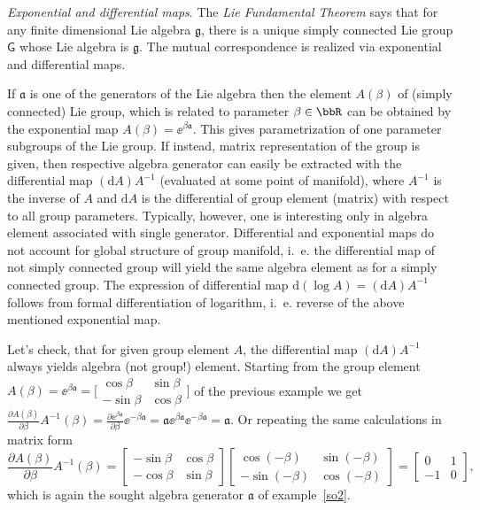 \begin{unit}\textit{Exponential and differential maps}.\label{expdiffmap}
The \textit{Lie Fundamental Theorem} says that for any finite
dimensional Lie algebra $\mathfrak{g}$, there is a unique simply
connected Lie group $\mathsf{G}$ whose Lie algebra is
$\mathfrak{g}$. The mutual correspondence is realized via
exponential and differential maps.

If $\mathfrak{a}$ is one of the generators of the Lie algebra then the
element $A(\beta)$ of (simply connected) Lie group, which is
related to parameter $\beta\in\bbR$ can be obtained by the
exponential map $A(\beta)=\ee^{\beta \mathfrak{a}}$. This gives
parametrization of one parameter subgroups of the Lie group. If
instead, matrix representation of the group is given, then
respective algebra generator can easily be extracted with the
differential map $(\mathrm{d} A) A^{-1}$ (evaluated at some point
of manifold), where $A^{-1}$ is the inverse of $A$ and $\mathrm{d}
A$ is the differential of group element (matrix) with respect to
all group parameters. Typically, however, one is interesting only
in algebra element associated with single generator. Differential
and exponential maps do not account for global structure of group
manifold, i.~e. the differential map of not simply connected group
will yield the same algebra element as for a simply connected group.
The expression of differential map $\mathrm{d} (\log
A)=(\mathrm{d} A) A^{-1}$ follows from formal differentiation of
logarithm, i.~e. reverse of the above mentioned exponential map.
\end{unit}
%
\begin{example}\label{so2alg}
Let's check, that for given group element $A$, the differential
map $(\mathrm{d} A) A^{-1}$ always yields algebra (not group!)
element. Starting from the group element $A(\beta)=\ee^{\beta \mathfrak{a}}=
\bigl[\begin{smallmatrix}\cos\beta&\sin\beta\\-\sin\beta&\cos\beta\end{smallmatrix}\bigr]$
of the previous example we get $\frac{\partial
A(\beta)}{\partial\beta}A^{-1}(\beta)=\frac{\partial \ee^{\beta
\mathfrak{a}}}{\partial\beta} \ee^{-\beta \mathfrak{a}}=\mathfrak{a} \ee^{\beta \mathfrak{a}}
\ee^{-\beta \mathfrak{a}}=\mathfrak{a}$. Or repeating the same
calculations in matrix form
\[
\frac{\partial A(\beta)}{\partial\beta}A^{-1}(\beta)=
\begin{bmatrix}-\sin\beta&\cos\beta\\-\cos\beta&\sin\beta\end{bmatrix}
\begin{bmatrix}\cos(-\beta)&\sin(-\beta)\\-\sin(-\beta)&\cos(-\beta)\end{bmatrix}= \begin{bmatrix}0&1\\-1&0\end{bmatrix},
\]
which is again the sought algebra generator $\mathfrak{a}$ of
example~\ref{so2}.
\end{example}
